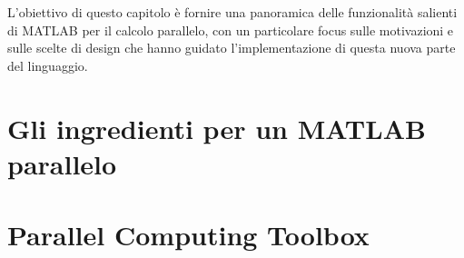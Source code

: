 \documentclass[
	a4paper,
	twoside,
	12pt
]{book}
\theoremstyle{StileEsempio}
\begin{document}
L'obiettivo di questo capitolo \`e fornire una panoramica delle funzionalit\`a salienti di MATLAB per il calcolo parallelo, 
con un particolare focus sulle motivazioni e sulle scelte di design che hanno guidato l'implementazione di questa nuova parte del linguaggio.
\section{Gli ingredienti per un MATLAB parallelo}
\label{par2.1}

\section{Parallel Computing Toolbox}
\label{par2.2}

\backmatter



\end{document}
